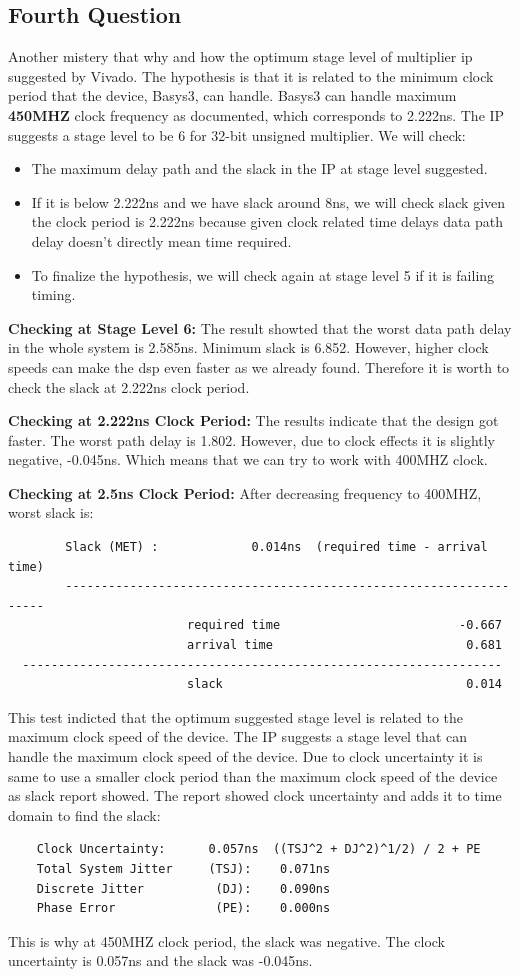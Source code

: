 \documentclass{report}
\begin{document}
\subsection{Fourth Question}
Another mistery that why and how the optimum stage level of multiplier ip suggested by Vivado. The hypothesis is that it is related to the minimum clock period that the device, Basys3, can handle. Basys3 can handle maximum \textbf{450MHZ} clock frequency as documented, which corresponds to 2.222ns. The IP suggests a stage level to be 6 for 32-bit unsigned multiplier. We will check:
\begin{itemize}
    \item The maximum delay path and the slack in the IP at stage level suggested.
    \item If it is below 2.222ns and we have slack around 8ns, we will check slack given the clock period is 2.222ns because given clock related time delays data path delay doesn't directly mean time required.
    \item To finalize the hypothesis, we will check again at stage level 5 if it is failing timing.
\end{itemize}

\textbf{Checking at Stage Level 6:}
The result showted that the worst data path delay in the whole system is 2.585ns. Minimum slack is 6.852. However, higher clock speeds can make the dsp even faster as we already found. Therefore it is worth to check the slack at 2.222ns clock period.

\textbf{Checking at 2.222ns Clock Period:}
The results indicate that the design got faster. The worst path delay is 1.802. However, due to clock effects it is slightly negative, -0.045ns. Which means that we can try to work with 400MHZ clock.

\textbf{Checking at 2.5ns Clock Period:}
After decreasing frequency to 400MHZ, worst slack is:
\begin{verbatim}
        Slack (MET) :             0.014ns  (required time - arrival time)
        -------------------------------------------------------------------
                         required time                         -0.667    
                         arrival time                           0.681    
  -------------------------------------------------------------------
                         slack                                  0.014    
\end{verbatim}

This test indicted that the optimum suggested stage level is related to the maximum clock speed of the device. The IP suggests a stage level that can handle the maximum clock speed of the device. Due to clock uncertainty it is same to use a smaller clock period than the maximum clock speed of the device as slack report showed. The report showed clock uncertainty and adds it to time domain to find the slack:
\begin{verbatim}
    Clock Uncertainty:      0.057ns  ((TSJ^2 + DJ^2)^1/2) / 2 + PE
    Total System Jitter     (TSJ):    0.071ns
    Discrete Jitter          (DJ):    0.090ns
    Phase Error              (PE):    0.000ns
\end{verbatim}
This is why at 450MHZ clock period, the slack was negative. The clock uncertainty is 0.057ns and the slack was -0.045ns.
\end{document}
